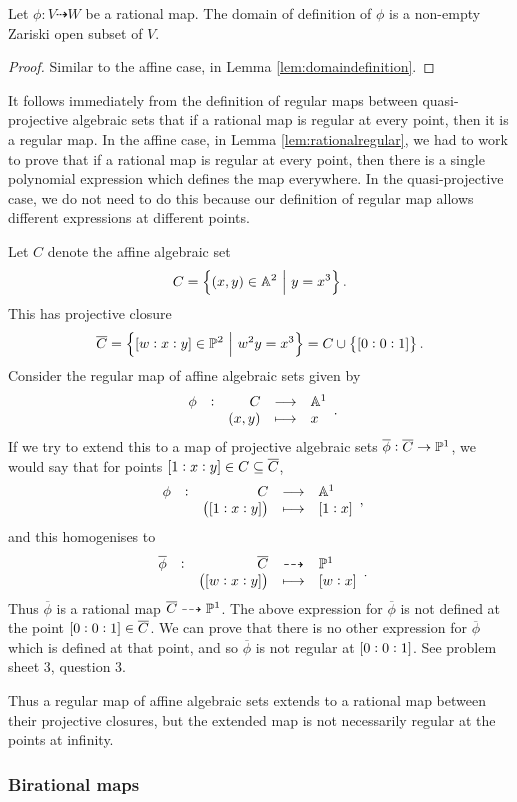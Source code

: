 \begin{lemma}
Let $ \phi : V \dashrightarrow W $ be a rational map. The domain of definition of $ \phi $ is a non-empty Zariski open subset of $ V $.
\end{lemma}

\begin{proof}
Similar to the affine case, in Lemma \ref{lem:domaindefinition}.
\end{proof}

It follows immediately from the definition of regular maps between quasi-projective algebraic sets that if a rational map is regular at every point, then it is a regular map. In the affine case, in Lemma \ref{lem:rationalregular}, we had to work to prove that if a rational map is regular at every point, then there is a single polynomial expression which defines the map everywhere. In the quasi-projective case, we do not need to do this because our definition of regular map allows different expressions at different points.

\begin{example*}
Let $ C $ denote the affine algebraic set
$$ C = \cbr{\br{x, y} \in \AA^2 \st y = x^3}. $$
This has projective closure
$$ \overline{C} = \cbr{\sbr{w : x : y} \in \PP^2 \st w^2y = x^3} = C \cup \cbr{\sbr{0 : 0 : 1}}. $$
Consider the regular map of affine algebraic sets given by
$$ \function[\phi]{C}{\AA^1}{\br{x, y}}{x}. $$
If we try to extend this to a map of projective algebraic sets $ \overline{\phi} : \overline{C} \to \mathbb{P}^1 $, we would say that for points $ \sbr{1 : x : y} \in C \subseteq \overline{C} $,
$$ \function[\phi]{C}{\AA^1}{\br{\sbr{1 : x : y}}}{\sbr{1 : x}}, $$
and this homogenises to
$$ \rational[\overline{\phi}]{\overline{C}}{\PP^1}{\br{\sbr{w : x : y}}}{\sbr{w : x}}. $$
Thus $ \overline{\phi} $ is a rational map $ \overline{C} \dashrightarrow \mathbb{P}^1 $. The above expression for $ \overline{\phi} $ is not defined at the point $ \sbr{0 : 0 : 1} \in \overline{C} $. We can prove that there is no other expression for $ \overline{\phi} $ which is defined at that point, and so $ \overline{\phi} $ is not regular at $ \sbr{0 : 0 : 1} $. See problem sheet $ 3 $, question $ 3 $.
\end{example*}

Thus a regular map of affine algebraic sets extends to a rational map between their projective closures, but the extended map is not necessarily regular at the points at infinity.

\pagebreak

\subsubsection{Birational maps}

